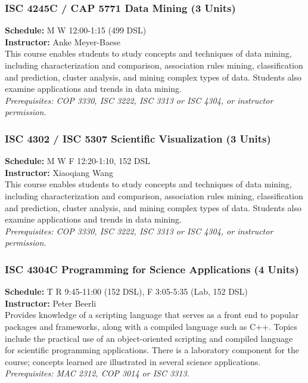 \documentclass[12pt,a4paper]{article}
\begin{document}
\subsubsection*{ISC 4245C / CAP 5771 Data Mining (3 Units)}
\textbf{Schedule:} M W 12:00-1:15 (499 DSL) \\
\textbf{Instructor:} Anke Meyer-Baese \\
This course enables students to study concepts and techniques of data mining, including characterization and comparison, association rules mining, classification and prediction, cluster analysis, and mining complex types of data. Students also examine applications and trends in data mining. \\
\textit{Prerequisites: COP 3330, ISC 3222, ISC 3313 or ISC 4304, or instructor permission.}

\subsubsection*{ISC 4302 / ISC 5307 Scientific Visualization (3 Units)}
\textbf{Schedule:} M W F 12:20-1:10, 152 DSL \\
\textbf{Instructor:} Xiaoqiang Wang \\
This course enables students to study concepts and techniques of data mining, including characterization and comparison, association rules mining, classification and prediction, cluster analysis, and mining complex types of data. Students also examine applications and trends in data mining. \\
\textit{Prerequisites: COP 3330, ISC 3222, ISC 3313 or ISC 4304, or instructor permission.}

\subsubsection*{ISC 4304C Programming for Science Applications (4 Units)}
\textbf{Schedule:} T R 9:45-11:00 (152 DSL), F 3:05-5:35 (Lab, 152 DSL) \\
\textbf{Instructor:} Peter Beerli \\
Provides knowledge of a scripting language that serves as a front end to popular packages and frameworks, along with a compiled language such as C++. Topics include the practical use of an object-oriented scripting and compiled language for scientific programming applications. There is a laboratory component for the course; concepts learned are illustrated in several science applications. \\
\textit{Prerequisites: MAC 2312, COP 3014 or ISC 3313.}
\end{document}
